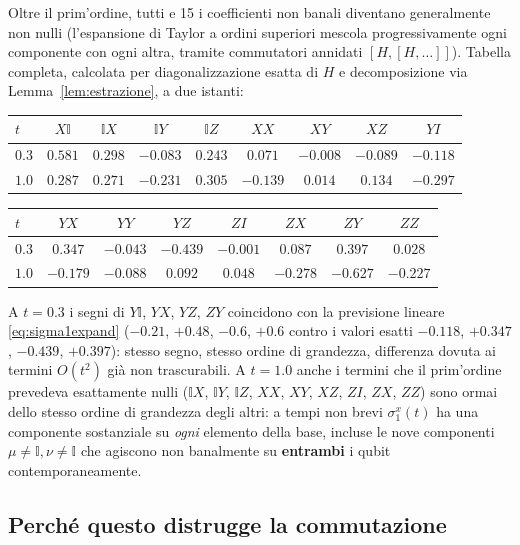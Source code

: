 \documentclass[11pt,a4paper]{article}
\begin{document}
Oltre il prim'ordine, tutti e 15 i coefficienti non banali diventano generalmente non nulli
(l'espansione di Taylor a ordini superiori mescola progressivamente ogni componente con ogni
altra, tramite commutatori annidati $[H,[H,\ldots]]$). Tabella completa, calcolata per
diagonalizzazione esatta di $H$ e decomposizione via Lemma~\ref{lem:estrazione}, a due istanti:

\begin{center}
\begin{tabular}{lcccccccc}
\toprule
$t$ & $X\mathbb I$ & $\mathbb IX$ & $\mathbb IY$ & $\mathbb IZ$ & $XX$ & $XY$ & $XZ$ & $YI$\\
\midrule
$0.3$ & $0.581$ & $0.298$ & $-0.083$ & $0.243$ & $0.071$ & $-0.008$ & $-0.089$ & $-0.118$\\
$1.0$ & $0.287$ & $0.271$ & $-0.231$ & $0.305$ & $-0.139$ & $0.014$ & $0.134$ & $-0.297$\\
\bottomrule
\end{tabular}

\vspace{4pt}
\begin{tabular}{lccccccc}
\toprule
$t$ & $YX$ & $YY$ & $YZ$ & $ZI$ & $ZX$ & $ZY$ & $ZZ$\\
\midrule
$0.3$ & $0.347$ & $-0.043$ & $-0.439$ & $-0.001$ & $0.087$ & $0.397$ & $0.028$\\
$1.0$ & $-0.179$ & $-0.088$ & $0.092$ & $0.048$ & $-0.278$ & $-0.627$ & $-0.227$\\
\bottomrule
\end{tabular}
\end{center}

\noindent
A $t=0.3$ i segni di $Y\mathbb I$, $YX$, $YZ$, $ZY$ coincidono con la previsione lineare
\eqref{eq:sigma1expand} ($-0.21$, $+0.48$, $-0.6$, $+0.6$ contro i valori esatti $-0.118$,
$+0.347$, $-0.439$, $+0.397$): stesso segno, stesso ordine di grandezza, differenza dovuta ai termini
$O(t^2)$ già non trascurabili. A $t=1.0$ anche i termini che il prim'ordine prevedeva
esattamente nulli ($\mathbb I X$, $\mathbb I Y$, $\mathbb I Z$, $XX$, $XY$, $XZ$, $ZI$, $ZX$,
$ZZ$) sono ormai dello
stesso ordine di grandezza degli altri: a tempi non brevi $\sigma_1^x(t)$ ha una componente
sostanziale su \emph{ogni} elemento della base, incluse le nove componenti $\mu\neq\mathbb
I,\nu\neq\mathbb I$ che agiscono non banalmente su \textbf{entrambi} i qubit contemporaneamente.

\subsection{Perché questo distrugge la commutazione}
\end{document}
